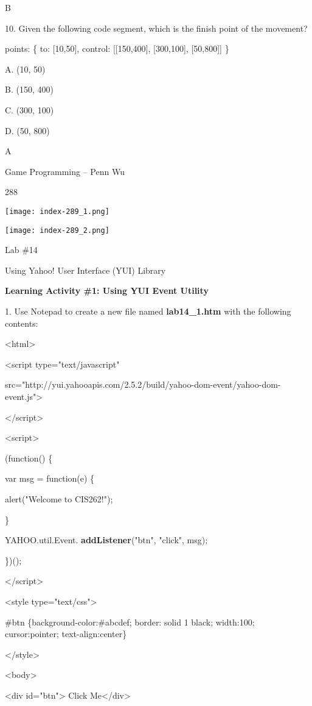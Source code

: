 \documentclass[
]{article}
\begin{document}
B

10. Given the following code segment, which is the finish point of the
movement?

points: \{ to: {[}10,50{]}, control: {[}{[}150,400{]}, {[}300,100{]},
{[}50,800{]}{]} \}

A. (10, 50)

B. (150, 400)

C. (300, 100)

D. (50, 800)

A

Game Programming -- Penn Wu

288

\protect\hypertarget{index_split_015.htmlux5cux23p289}{}{}\texttt{[image: index-289\_1.png]}

\texttt{[image: index-289\_2.png]}

Lab \#14

Using Yahoo! User Interface (YUI) Library

\textbf{Learning Activity \#1: Using YUI Event Utility}

1. Use Notepad to create a new file named \textbf{lab14\_1.htm} with the
following contents:

\textless html\textgreater{}

\textless script type="text/javascript"

src="http://yui.yahooapis.com/2.5.2/build/yahoo-dom-event/yahoo-dom-event.js"\textgreater{}

\textless/script\textgreater{}

\textless script\textgreater{}

(function() \{

var msg = function(e) \{

alert("Welcome to CIS262!");

\}

YAHOO.util.Event. \textbf{addListener}("btn", "click", msg);

\})();

\textless/script\textgreater{}

\textless style type="text/css"\textgreater{}

\#btn \{background-color:\#abcdef; border: solid 1 black; width:100;
cursor:pointer; text-align:center\}

\textless/style\textgreater{}

\textless body\textgreater{}

\textless div id="btn"\textgreater{} Click Me\textless/div\textgreater{}
\end{document}
